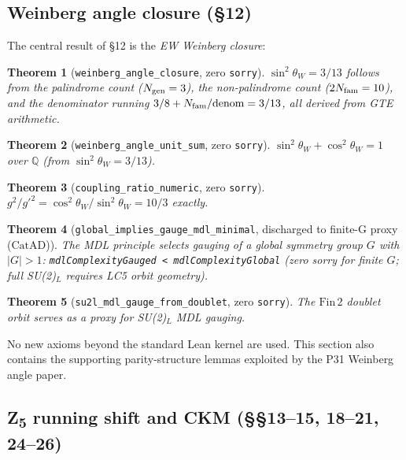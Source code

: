 \documentclass[11pt,a4paper]{article}
\newtheorem{theorem}{Theorem}[section]
\theoremstyle{definition}
\newcommand{\CatAD}{\ensuremath{\mathrm{CatAD}}}
\begin{document}
\subsection{Weinberg angle closure (§12)}\label{subsec:gut-weinberg-closure}

The central result of §12 is the \emph{EW Weinberg closure}:

\begin{theorem}[\lstinline|weinberg_angle_closure|, zero \texttt{sorry}]
$\sin^2\theta_W = 3/13$ follows from the palindrome count ($N_{\rm gen}=3$),
the non-palindrome count ($2N_{\rm fam}=10$), and the denominator running
$3/8 + N_{\rm fam}/\mathrm{denom} = 3/13$, all derived from GTE arithmetic.
\end{theorem}

\begin{theorem}[\lstinline|weinberg_angle_unit_sum|, zero \texttt{sorry}]
$\sin^2\theta_W + \cos^2\theta_W = 1$ over $\mathbb{Q}$ (from $\sin^2\theta_W = 3/13$).
\end{theorem}

\begin{theorem}[\lstinline|coupling_ratio_numeric|, zero \texttt{sorry}]
$g^2/{g'}^2 = \cos^2\theta_W/\sin^2\theta_W = 10/3$ exactly.
\end{theorem}

\begin{theorem}[\lstinline|global_implies_gauge_mdl_minimal|, discharged to finite-G proxy ($\CatAD$)]
The MDL principle selects gauging of a global symmetry group $G$ with $|G|>1$: \lstinline|mdlComplexityGauged < mdlComplexityGlobal| (zero sorry for finite $G$; full SU(2)$_L$ requires LC5 orbit geometry).
\end{theorem}

\begin{theorem}[\lstinline|su2l_mdl_gauge_from_doublet|, zero \texttt{sorry}]
The $\mathrm{Fin}\,2$ doublet orbit serves as a proxy for SU(2)$_L$ MDL gauging.
\end{theorem}

No new axioms beyond the standard Lean kernel are used.  This section also contains the
supporting parity-structure lemmas exploited by the P31 Weinberg angle paper.

\subsection{Z\textsubscript{5} running shift and CKM (§§13--15, 18--21, 24--26)}\label{subsec:gut-ckm}
\end{document}
